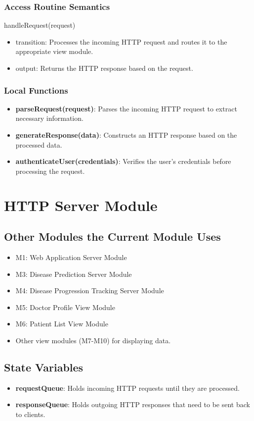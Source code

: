 \documentclass[12pt, titlepage]{article}
\begin{document}
\subsubsection{Access Routine Semantics}

handleRequest(request)
\begin{itemize}
\item transition:  Processes the incoming HTTP request and routes it to the appropriate view module.
\item output: Returns the HTTP response based on the request.
\end{itemize}
\subsubsection{Local Functions}
\begin{itemize}
  \item \textbf{parseRequest(request)}: Parses the incoming HTTP request to extract necessary information.
  \item \textbf{generateResponse(data)}: Constructs an HTTP response based on the processed data.
  \item \textbf{authenticateUser(credentials)}: Verifies the user's credentials before processing the request.
\end{itemize}
\newpage

\newpage
\section{HTTP Server Module}

\subsection{Other Modules the Current Module Uses}
\begin{itemize}
    \item M1: Web Application Server Module
    \item M3: Disease Prediction Server Module
    \item M4: Disease Progression Tracking Server Module
    \item M5: Doctor Profile View Module
    \item M6: Patient List View Module
    \item Other view modules (M7-M10) for displaying data.
\end{itemize}

\subsection{State Variables}
\begin{itemize}
    \item \textbf{requestQueue}: Holds incoming HTTP requests until they are processed.
    \item \textbf{responseQueue}: Holds outgoing HTTP responses that need to be sent back to clients.
\end{itemize}
\end{document}
